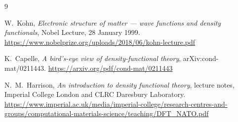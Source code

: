 \documentclass[11pt,a4paper]{article}
\begin{document}
{\small
\begin{thebibliography}{9}

W.~Kohn, \emph{Electronic structure of matter --- wave functions and density functionals},
Nobel Lecture, 28 January 1999.
\url{https://www.nobelprize.org/uploads/2018/06/kohn-lecture.pdf}

K.~Capelle, \emph{A bird's-eye view of density-functional theory}, arXiv:cond-mat/0211443.
\url{https://arxiv.org/pdf/cond-mat/0211443}

N.~M.~Harrison, \emph{An introduction to density functional theory}, lecture notes, Imperial College
London and CLRC Daresbury Laboratory.
\url{https://www.imperial.ac.uk/media/imperial-college/research-centres-and-groups/computational-materials-science/teaching/DFT_NATO.pdf}

\end{thebibliography}
}
\end{document}
